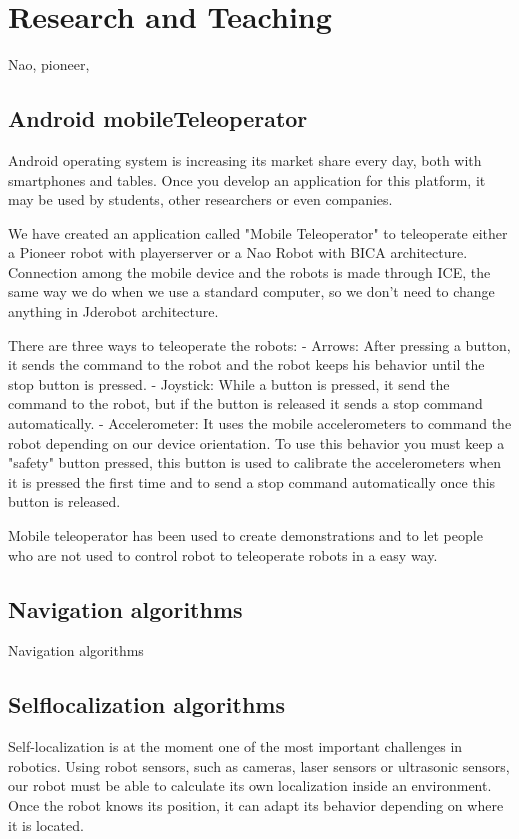 \documentclass[twocolumn]{svjour3}          %
\begin{document}
\section{Research and Teaching}

Nao, pioneer,

\subsection{Android mobileTeleoperator}

Android operating system is increasing its market share every day, both with smartphones and tables. Once you develop an application for this platform, it may be used by students, other researchers or even companies. 

We have created an application called "Mobile Teleoperator" to teleoperate either a Pioneer robot with playerserver or a Nao Robot with BICA architecture. Connection among the mobile device and the robots is made through ICE, the same way we do when we use a standard computer, so we don't need to change anything in Jderobot architecture.

There are three ways to teleoperate the robots:
- Arrows: After pressing a button, it sends the command to the robot and the robot keeps his behavior until the stop button is pressed.
- Joystick: While a button is pressed, it send the command to the robot, but if the button is released it sends a stop command automatically.
- Accelerometer: It uses the mobile accelerometers to command the robot depending on our device orientation. To use this behavior you must keep a "safety" button pressed, this button is used to calibrate the accelerometers when it is pressed the first time and to send a stop command automatically once this button is released.

Mobile teleoperator has been used to create demonstrations and to let people who are not used to control robot to teleoperate robots in a easy way.

\subsection{Navigation algorithms}
Navigation algorithms
\subsection{Selflocalization algorithms}

Self-localization is at the moment one of the most important challenges in robotics. Using robot sensors, such as cameras, laser sensors or ultrasonic sensors, our robot must be able to calculate its own localization inside an environment. Once the robot knows its position, it can adapt its behavior depending on where it is located. 
 
\end{document}
